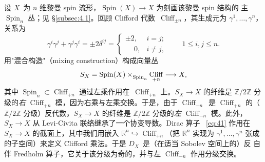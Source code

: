 \documentclass[11pt]{amsart}
\theoremstyle{definition}
\theoremstyle{remark}
\theoremstyle{plain}
\numberwithin{equation}{section}
\renewcommand{\:}{\colon}
\newcommand{\RR}{{\mathbb R}}
\DeclareMathOperator{\Spin}{Spin}
\newcommand{\ZZ}{{\mathbb Z}}
\DeclareRobustCommand{\mstrut}{^{\vphantom{1*\prime y\vee M}}}
\newcommand{\zmod}[1]{\ZZ/#1\ZZ}
\newcommand{\zt}{\zmod2}
\DeclareMathOperator{\Cliff}{Cliff}
\newcommand{\Clpm}{\Cliff_{\pm n}}
\newcommand{\Cnm}{\Cliff_{-n}}
\newcommand{\Cnp}{\Cliff_{+n}}
\begin{document}
设 $X$~为 $n$ 维黎曼 spin 流形，$\Spin(X)\to X$ 为刻画该黎曼 spin 结构的
主 $\Spin_n$ 丛；见 \S\ref{subsec:4.1}。回顾 Clifford 代数~$\Clpm$，其生成元为
$\gamma ^1,\dots ,\gamma ^n$，关系为
  \begin{equation}\label{eq:79}
     \gamma ^i\gamma ^j + \gamma ^j\gamma ^i = \pm 2\delta ^{ij} = \begin{cases}
     \pm 2,&i=j;\\\phantom{\pm}0,&i\neq j,\end{cases}\qquad 1\le i,j\le n. 
  \end{equation}
用"混合构造"（mixing construction）构成向量丛
  \begin{equation}\label{eq:80}
     S_X=\Spin(X)\times \mstrut _{\Spin_n}\Cnp\longrightarrow X, 
  \end{equation}
其中 $\Spin_n\subset \Cnp$ 通过左乘作用在~$\Cnp$ 上。$S_X\to X$ 的纤维是
$\zt$ 分级的\emph{右} $\Cnp$ 模，因为右乘与左乘交换。于是，由于 $\Cnm$~是
$\Cnp$ 的（$\zt$ 分级）反代数，$S_X\to X$ 的纤维是 $\zt$ 分级的\emph{左}
$\Cnm$ 模。此外，$S_X\to X$ 从 Levi-Civita 联络继承了一个协变导数。Dirac 算子
~\eqref{eq:41} 作用在 $S_X\to X$ 的截面上，其中我们用嵌入
$\RR^n\hookrightarrow \Cnp$（把 $\RR^n$ 实现为 $\gamma ^1,\dots ,\gamma ^n$
张成的子空间）来定义 Clifford 乘法。于是 $D_X$~是（在适当 Sobolev 空间上的）反
自伴 Fredholm 算子，它关于该分级为奇的，并与左 $\Cnm$ 作用分级交换。
\end{document}
